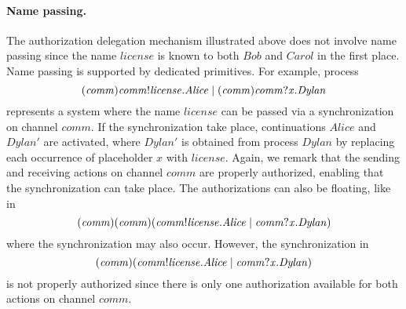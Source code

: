 \paragraph{{Name passing}.}  The authorization delegation mechanism illustrated above does not involve name passing since the name $\mathit{license}$ is known to both $\mathit{Bob}$ and $\mathit{Carol}$ in the first 
place.  Name passing is supported by dedicated primitives. For example, process
%
$$(\mathit{comm})\mathit{comm}!\mathit{license}.{\mathit{Alice}}
\;|\; (\mathit{comm})\mathit{comm}?\mathit{x}.{\mathit{Dylan}}$$
%
represents a system where the name $\mathit{license}$ can be passed
via a synchronization on 
channel $\mathit{comm}$. If the synchronization take place, continuations $\mathit{Alice}$ 
and $\mathit{Dylan}'$ are activated, where $\mathit{Dylan}'$ is obtained from process $\mathit{Dylan}$ by replacing each occurrence of placeholder $x$ with
$\mathit{license}$. Again, we remark that the sending and receiving actions on channel $\mathit{comm}$ are properly authorized, enabling that the synchronization can take place. The authorizations can also be floating, like in
\[
     {(\mathit{comm})(\mathit{comm}) (\mathit{comm}!\mathit{license}.{\mathit{Alice}}
\;|\; \mathit{comm}?\mathit{x}.{\mathit{Dylan}})}
\]
where the synchronization may also occur. However, the synchronization in 
\[
(\mathit{comm}) (\mathit{comm}!\mathit{license}.{\mathit{Alice}}
\;|\; \mathit{comm}?\mathit{x}.{\mathit{Dylan}})
\]
is not properly authorized since there is only one authorization available for both actions on channel $\mathit{comm}$.



